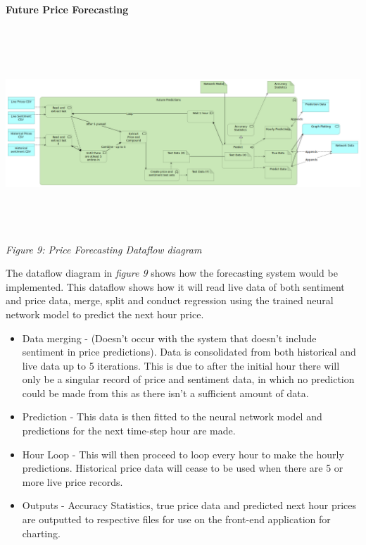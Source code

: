 \documentclass[oneside, 12pt]{article}
\begin{document}
		\textbf{Future Price Forecasting}
		\begin{center}
			\includegraphics[width=18cm,height=8cm]{images/Future_Predictions.png}
			\textit{Figure 9: Price Forecasting Dataflow diagram}
		\end{center}
		The dataflow diagram in \textit{figure 9} shows how the forecasting system would be implemented. This dataflow shows how it will read live data of both sentiment and price data, merge, split and conduct regression using the trained neural network model to predict the next hour price.
		\begin{itemize}
			 \item Data merging - (Doesn't occur with the system that doesn't include sentiment in price predictions). Data is consolidated from both historical and live data up to 5 iterations. This is due to after the initial hour there will only be a singular record of price and sentiment data, in which no prediction could be made from this as there isn't a sufficient amount of data.
			 \item Prediction - This data is then fitted to the neural network model and predictions for the next time-step hour are made.
			 \item Hour Loop - This will then proceed to loop every hour to make the hourly predictions. Historical price data will cease to be used when there are 5 or more live price records.
			 \item Outputs - Accuracy Statistics, true price data and predicted next hour prices are outputted to respective files for use on the front-end application for charting.
		\end{itemize}
	
\end{document}
